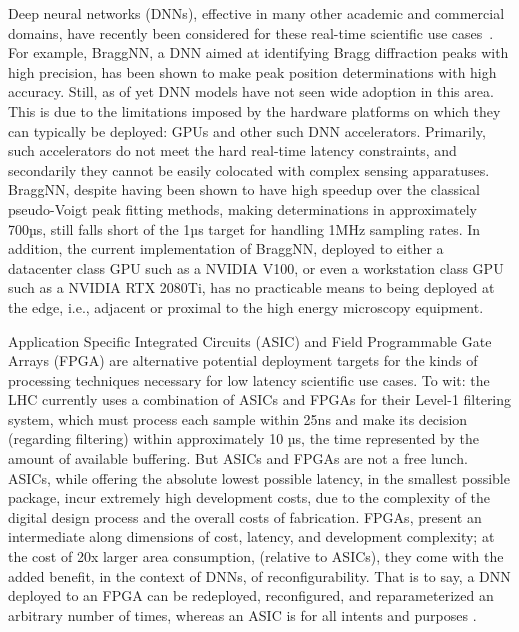 Deep neural networks (DNNs), effective in many other academic and commercial domains, have recently been considered for these real-time scientific use cases~\cite{Guest:2018yhq}.
For example, BraggNN, a DNN aimed at identifying Bragg diffraction peaks with high precision, has been shown to make peak position determinations with high accuracy.
Still, as of yet DNN models have not seen wide adoption in this area.
This is due to the limitations imposed by the hardware platforms on which they can typically be deployed: GPUs and other such DNN accelerators.
Primarily, such accelerators do not meet the hard real-time latency constraints, and secondarily they cannot be easily colocated with complex sensing apparatuses.
BraggNN, despite having been shown to have high speedup over the classical pseudo-Voigt peak fitting methods, making determinations in approximately 700µs, still falls short of the 1µs target for handling 1MHz sampling rates.
In addition, the current implementation of BraggNN, deployed to either a datacenter class GPU such as a NVIDIA V100, or even a workstation class GPU such as a NVIDIA RTX 2080Ti, has no practicable means to being deployed at the edge, i.e., adjacent or proximal to the high energy microscopy equipment.


Application Specific Integrated Circuits (ASIC) and Field Programmable Gate Arrays (FPGA) are alternative potential deployment targets for the kinds of processing techniques necessary for low latency scientific use cases.
To wit: the LHC currently uses a combination of ASICs and FPGAs for their Level-1 filtering system, which must process each sample within 25ns and make its decision (regarding filtering) within approximately 10 µs, the time represented by the amount of available buffering.
But ASICs and FPGAs are not a free lunch.
ASICs, while offering the absolute lowest possible latency, in the smallest possible package, incur extremely high development costs, due to the complexity of the digital design process and the overall costs of fabrication.
FPGAs, present an intermediate along dimensions of cost, latency, and development complexity; at the cost of 20x larger area consumption,  (relative to ASICs), they come with the added benefit, in the context of DNNs, of reconfigurability.
That is to say, a DNN deployed to an FPGA can be redeployed, reconfigured, and reparameterized an arbitrary number of times, whereas an ASIC is for all intents and purposes .

